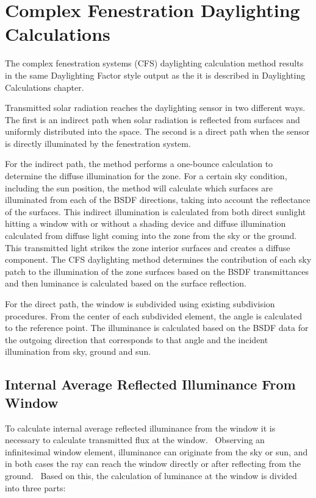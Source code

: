 \section{Complex Fenestration Daylighting Calculations}\label{complex-fenestration-daylighting-calculations}

The complex fenestration systems (CFS) daylighting calculation method results in the same Daylighting Factor style output as the it is described in Daylighting Calculations chapter.

Transmitted solar radiation reaches the daylighting sensor in two different ways. The first is an indirect path when solar radiation is reflected from surfaces and uniformly distributed into the space. The second is a direct path when the sensor is directly illuminated by the fenestration system.

For the indirect path, the method performs a one-bounce calculation to determine the diffuse illumination for the zone. For a certain sky condition, including the sun position, the method will calculate which surfaces are illuminated from each of the BSDF directions, taking into account the reflectance of the surfaces. This indirect illumination is calculated from both direct sunlight hitting a window with or without a shading device and diffuse illumination calculated from diffuse light coming into the zone from the sky or the ground. This transmitted light strikes the zone interior surfaces and creates a diffuse component. The CFS daylighting method determines the contribution of each sky patch to the illumination of the zone surfaces based on the BSDF transmittances and then luminance is calculated based on the surface reflection.

For the direct path, the window is subdivided using existing subdivision procedures. From the center of each subdivided element, the angle is calculated to the reference point. The illuminance is calculated based on the BSDF data for the outgoing direction that corresponds to that angle and the incident illumination from sky, ground and sun.

\subsection{Internal Average Reflected Illuminance From Window}\label{internal-average-reflected-illuminance-from-window}

To calculate internal average reflected illuminance from the window it is necessary to calculate transmitted flux at the window.~ Observing an infinitesimal window element, illuminance can originate from the sky or sun, and in both cases the ray can reach the window directly or after reflecting from the ground.~ Based on this, the calculation of luminance at the window is divided into three parts:

